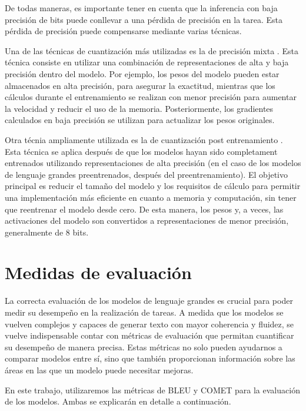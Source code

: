 \documentclass[11pt,spanish,listoffigures,listoftables]{tfgetsinf}
\begin{document}
De todas maneras, es importante tener en cuenta que la inferencia con baja precisión de bits puede conllevar a una pérdida de precisión en la tarea. Esta pérdida de precisión puede compensarse mediante varias técnicas.

Una de las técnicas de cuantización más utilizadas es la de precisión mixta \cite{micikevicius2018mixedprecisiontraining}. Esta técnica consiste en utilizar una combinación de representaciones de alta y baja precisión dentro del modelo. Por ejemplo, los pesos del modelo pueden estar almacenados en alta precisión, para asegurar la exactitud, mientras que los cálculos durante el entrenamiento se realizan con menor precisión para aumentar la velocidad y reducir el uso de la memoria. Posteriormente, los gradientes calculados en baja precisión se utilizan para actualizar los pesos originales.

Otra técnia ampliamente utilizada es la de cuantización post entrenamiento \cite{xiao2024smoothquantaccurateefficientposttraining}. Esta técnica se aplica después de que los modelos hayan sido completament entrenados utilizando representaciones de alta precisión (en el caso de los modelos de lenguaje grandes preentrenados, después del preentrenamiento). El objetivo principal es reducir el tamaño del modelo y los requisitos de cálculo para permitir una implementación más eficiente en cuanto a memoria y computación, sin tener que reentrenar el modelo desde cero. De esta manera, los pesos y, a veces, las activaciones del modelo son convertidos a representaciones de menor precisión, generalmente de 8 bits.

\section{Medidas de evaluación} \label{metricas}

La correcta evaluación de los modelos de lenguaje grandes es crucial para poder medir su desempeño en la realización de tareas. A medida que los modelos se vuelven complejos y capaces de generar texto con mayor coherencia y fluidez, se vuelve indispensable contar con métricas de evaluación que permitan cuantificar su desempeño de manera precisa. Estas métricas no solo pueden ayudarnos a comparar modelos entre sí, sino que también proporcionan información sobre las áreas en las que un modelo puede necesitar mejoras.

En este trabajo, utilizaremos las métricas de BLEU y COMET para la evaluación de los modelos. Ambas se explicarán en detalle a continuación.
\end{document}
